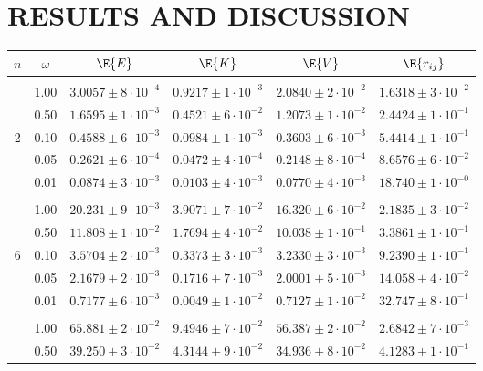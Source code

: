 \documentclass[11pt,english,a4paper]{article}
\begin{document}
\section*{\uppercase{Results and discussion}}
\begin{table}
\center
\begin{tabular}{c c c c c c}
$n$ &$\omega$& $\E{E}$						& $\E{K}$						& $\E{V}$							& $\E{r_{ij}}$							\\
\hline\\
	&1.00 	& $3.0057\pm 8\cdot 10^{-4}$	& $0.9217\pm 1\cdot 10^{-3}$& $2.0840\pm 2\cdot 10^{-2}$	& $1.6318\pm 3\cdot 10^{-2}$\\
	&0.50 	& $1.6595\pm 1\cdot 10^{-3}$ 	& $0.4521\pm 6\cdot 10^{-2}$ 	& $1.2073\pm 1\cdot 10^{-2}$		& $2.4424\pm 1\cdot 10^{-1}$\\
2	&0.10	& $0.4588\pm 6\cdot 10^{-3}$ 	& $0.0984\pm 1\cdot 10^{-3}$ 	& $0.3603\pm 6\cdot 10^{-3}$		& $5.4414\pm 1\cdot 10^{-1}$\\
	&0.05	& $0.2621\pm 6\cdot 10^{-4}$	& $0.0472\pm 4\cdot 10^{-4}$ 	& $0.2148\pm 8\cdot 10^{-4}$		& $8.6576\pm 6\cdot 10^{-2}$\\
	&0.01	& $0.0874\pm 3\cdot 10^{-3}$	& $0.0103\pm 4\cdot 10^{-3}$ 	& $0.0770\pm 4\cdot 10^{-3}$		& $18.740\pm 1\cdot 10^{-0}$\\
	\\
	&1.00 	& $20.231\pm 9\cdot 10^{-3}$ 	& $3.9071\pm 7\cdot 10^{-2}$ 	& $16.320\pm 6\cdot 10^{-2}$		& $2.1835\pm 3\cdot 10^{-2}$\\
	&0.50 	& $11.808\pm 1\cdot 10^{-2}$ 	& $1.7694\pm 4\cdot 10^{-2}$ 	& $10.038\pm 1\cdot 10^{-1}$		& $3.3861\pm 1\cdot 10^{-1}$\\
6	&0.10	& $3.5704\pm 2\cdot 10^{-3}$ 	& $0.3373\pm 3\cdot 10^{-3}$ 	& $3.2330\pm 3\cdot 10^{-3}$		& $9.2390\pm 1\cdot 10^{-1}$\\
	&0.05	& $2.1679\pm 2\cdot 10^{-3}$ 	& $0.1716\pm 7\cdot 10^{-3}$ 	& $2.0001\pm 5\cdot 10^{-3}$		& $14.058\pm 4\cdot 10^{-2}$\\
	&0.01	& $0.7177\pm 6\cdot 10^{-3}$ 	& $0.0049\pm 1\cdot 10^{-2}$ 	& $0.7127\pm 1\cdot 10^{-2}$		& $32.747\pm 8\cdot 10^{-1}$\\
	\\
	&1.00 	& $65.881\pm 2\cdot 10^{-2}$ 	& $9.4946\pm 7\cdot 10^{-2}$ 	& $56.387\pm 2\cdot 10^{-2}$		& $2.6842\pm 7\cdot 10^{-3}$\\
	&0.50 	& $39.250\pm 3\cdot 10^{-2}$ 	& $4.3144\pm 9\cdot 10^{-2}$ 	& $34.936\pm 8\cdot 10^{-2}$		& $4.1283\pm 1\cdot 10^{-1}$\\

\end{tabular}
\end{table}
\end{document}

